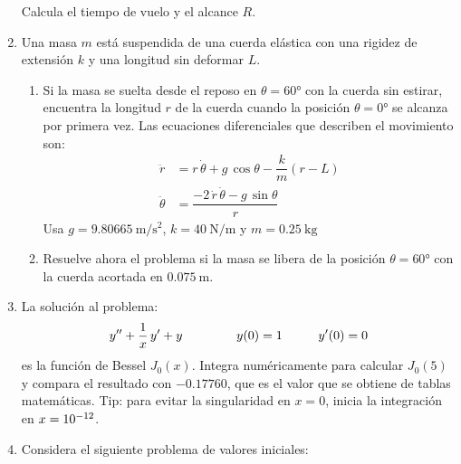 \begin{enumerate}
Calcula el tiempo de vuelo y el alcance $R$.
\item Una masa $m$ está suspendida de una cuerda elástica con una rigidez de extensión $k$ y una longitud sin deformar $L$. 
\begin{figure}[H]
\centering
{}
\end{figure}
\begin{enumerate}
\item Si la masa se suelta desde el reposo en $\theta = \ang{60}$ con la cuerda sin estirar, encuentra la longitud $r$ de la cuerda cuando la posición $\theta = \ang{0}$ se alcanza por primera vez. Las ecuaciones diferenciales que describen el movimiento son:
\begin{align*}
\ddot{r} &= r \, \dot{\theta} + g \, \cos \theta - \dfrac{k}{m} (r - L) \\[0.5em]
\ddot{\theta} &= \dfrac{-2 \, \dot{r} \, \dot{\theta} - g \, \sin \theta}{r}
\end{align*}
Usa $g = \SI{9.80665}{\meter\per\square\second}$, $k = \SI{40}{\newton\per\metre}$ y $m = \SI{0.25}{\kilo\gram}$
\item Resuelve ahora el problema si la masa se libera de la posición $\theta = \ang{60}$ con la cuerda acortada en $\SI{0.075}{\meter}$.
\end{enumerate}
\item La solución al problema:
\begin{align*}
{y}^{\prime \prime} + \dfrac{1}{x} \, {y}^{\prime} + y \hspace{1.5cm} y (0) = 1 \hspace{1cm} {y}^{\prime}(0) = 0
\end{align*}
es la función de Bessel $J_{0} (x)$. Integra numéricamente para calcular $J_{0} (5)$ y compara el resultado con $-0.17760$, que es el valor que se obtiene de tablas matemáticas. Tip: para evitar la singularidad en $x = 0$, inicia la integración en $x = \num{d-12}$.
\item Considera el siguiente problema de valores iniciales:

\end{enumerate}
